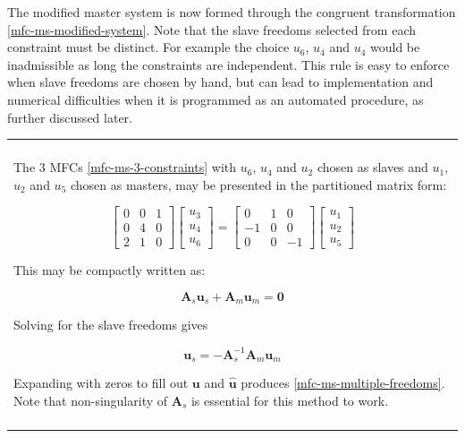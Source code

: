 \documentclass[10pt,b5paper,titlepage]{book}
\newcommand{\m}{\mathbf}
\newenvironment{bbox}[1][0.96]
{
    \begin{center}
        \begin{tabular}{|p{#1\textwidth}|}
            \hline\\
}
{
            \\\\\hline
        \end{tabular}
    \end{center}
}
\begin{document}
The modified master system is now formed through the congruent
transformation \eqref{mfc-ms-modified-system}.
Note that the slave freedoms selected from each
constraint must be distinct. For example the choice $ u_6 $, $ u_4 $ and $ u_4 $
would be inadmissible as long the constraints are independent. This rule is easy
to enforce when slave freedoms are chosen by hand, but can lead to implementation
and numerical difficulties when it is programmed as an automated procedure, as
further discussed later.

\begin{bbox}
    The 3 MFCs \eqref{mfc-ms-3-constraints} with $ u_6 $, $ u_4 $ and $ u_2 $ chosen
    as slaves and $ u_1 $, $ u_2 $ and $ u_5 $ chosen as masters, may be presented
    in the partitioned matrix form:

    \begin{equation}
        \begin{bmatrix}
            0 & 0 & 1 \\
            0 & 4 & 0 \\
            2 & 1 & 0
        \end{bmatrix}
        \begin{bmatrix}
            u_3 \\
            u_4 \\
            u_6
        \end{bmatrix}
        = \begin{bmatrix}
            0 & 1 & 0 \\
            -1 & 0 & 0 \\
            0 & 0 & -1
        \end{bmatrix}
        \begin{bmatrix}
            u_1 \\
            u_2 \\
            u_5
        \end{bmatrix}
    \end{equation}

     This may be compactly written as:

     \begin{equation}
         \m{A}_s \m{u}_s + \m{A}_m \m{u}_m = \m{0}
     \end{equation}

     Solving for the slave freedoms gives

     \begin{equation}
         \m{u}_s = -\m{A}_s^{-1} \m{A}_m \m{u}_m
     \end{equation}

     Expanding with zeros to fill out $ \m{u} $ and $ \m{\hat{u}} $
     produces \eqref{mfc-ms-multiple-freedoms}. Note that non-singularity of
     $ \m{A}_s $ is essential for this method to work.
\end{bbox}
\end{document}
